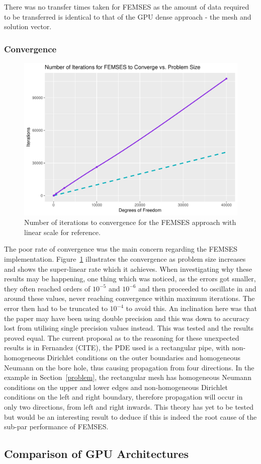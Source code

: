 There was no transfer times taken for FEMSES as the amount of data required to be transferred is identical to that of the GPU dense approach - the mesh and solution vector.
  
\subsubsection{Convergence}

\begin{figure}
	\centering
	\includegraphics[width=0.58\linewidth]{Plots/iters_v_n}
	\caption{Number of iterations to convergence for the FEMSES approach with linear scale for reference.}
	\label{fig:converg}
\end{figure}
The poor rate of convergence was the main concern regarding the FEMSES implementation. Figure~\ref{fig:converg} illustrates the convergence as problem size increases and shows the super-linear rate which it achieves. When investigating why these results may be happening, one thing which was noticed, as the errors got smaller, they often reached orders of $10^{-5}$ and $10^{-6}$ and then proceeded to oscillate in and around these values, never reaching convergence within maximum iterations. The error then had to be truncated to $10^{-4}$ to avoid this. An inclination here was that the paper may have been using double precision and this was down to accuracy lost from utilising single precision values instead. This was tested and the results proved equal. The current proposal as to the reasoning for these unexpected results is in Fernandez (CITE), the PDE used is a rectangular pipe, with non-homogeneous Dirichlet conditions on the outer boundaries and homogeneous Neumann on the bore hole, thus causing propagation from four directions. In the example in Section~\ref{problem}, the rectangular mesh has homogeneous Neumann conditions on the upper and lower edges and non-homogeneous Dirichlet conditions on the left and right boundary, therefore propagation will occur in only two directions, from left and right inwards. This theory has yet to be tested but would be an interesting result to deduce if this is indeed the root cause of the sub-par performance of FEMSES. 

\subsection{Comparison of GPU Architectures}